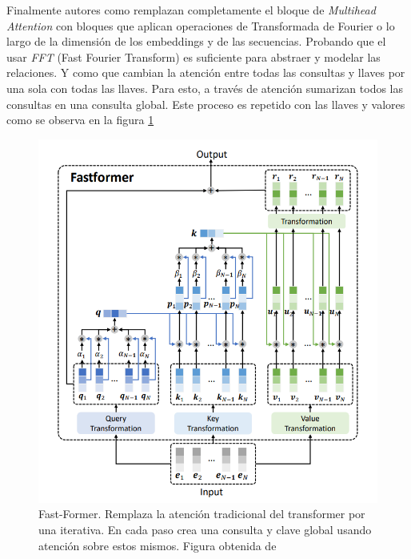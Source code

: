 Finalmente autores como \citeauthor{DBLP:journals/corr/abs-2105-03824} remplazan completamente
el bloque de \textit{Multihead Attention} con bloques que aplican operaciones de Transformada de
Fourier o lo largo de la dimensión de los  embeddings y de las secuencias. Probando que el usar
\textit{FFT} (Fast Fourier Transform) es suficiente para abstraer y modelar las relaciones. Y como
\citeauthor{DBLP:journals/corr/abs-2108-09084} que cambian la atención entre todas las consultas
y llaves por una sola con todas las llaves. Para esto, a través de atención sumarizan todos las
consultas en una consulta global. Este proceso es repetido con las llaves y valores como se observa
en la figura \ref{fig:fast-former}

\begin{figure}[ht!]
    \centering
    \includegraphics[width=0.6 \textwidth]{Chapters/2. Transformer/Figures/transformer/fastformer.png}
    \caption{Fast-Former. Remplaza la atención tradicional del  transformer por una iterativa. En
             cada paso crea una consulta y clave global usando atención sobre estos mismos.
             Figura obtenida de \cite{DBLP:journals/corr/abs-2108-09084}}
    \label{fig:fast-former}
\end{figure}
